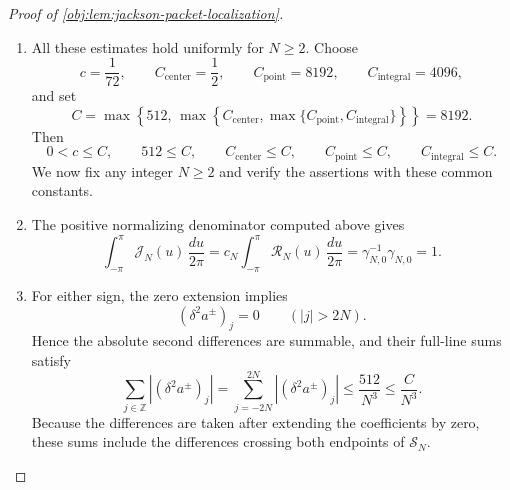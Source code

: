 \begin{proof}[Proof of \cref{obj:lem:jackson-packet-localization}]
\begin{enumerate}
\item All these estimates hold uniformly for \(N\geq2\). Choose
\[
c=\frac1{72},\qquad
C_{\mathrm{center}}=\frac12,\qquad
C_{\mathrm{point}}=8192,\qquad
C_{\mathrm{integral}}=4096,
\]
and set
\[
C=\max\left\{
512,\,
\max\left\{
C_{\mathrm{center}},
\max\{C_{\mathrm{point}},C_{\mathrm{integral}}\}
\right\}
\right\}
=8192.
\]
Then
\[
0<c\leq C,\qquad
512\leq C,\qquad
C_{\mathrm{center}}\leq C,\qquad
C_{\mathrm{point}}\leq C,\qquad
C_{\mathrm{integral}}\leq C.
\]
We now fix any integer \(N\geq2\) and verify the assertions with these common constants.

\item The positive normalizing denominator computed above gives
\[
\int_{-\pi}^{\pi}\mathcal J_N(u)\,\frac{du}{2\pi}
=c_N\int_{-\pi}^{\pi}\mathcal R_N(u)\,\frac{du}{2\pi}
=\gamma_{N,0}^{-1}\gamma_{N,0}
=1.
\]

\item For either sign, the zero extension implies
\[
(\delta^2a^\pm)_j=0\qquad(|j|>2N).
\]
Hence the absolute second differences are summable, and their full-line sums satisfy
\[
\sum_{j\in\mathbb Z}|(\delta^2a^\pm)_j|
=
\sum_{j=-2N}^{2N}|(\delta^2a^\pm)_j|
\leq\frac{512}{N^3}
\leq\frac C{N^3}.
\]
Because the differences are taken after extending the coefficients by zero, these sums include the differences crossing both endpoints of \(\mathcal S_N\).


\end{enumerate}
\end{proof}
